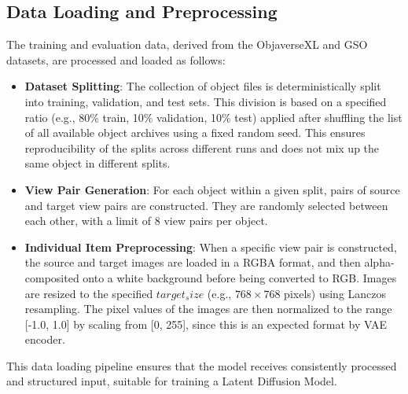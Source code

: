 \subsection{Data Loading and Preprocessing}\label{ssec:exp_data_loading}
The training and evaluation data, derived from the ObjaverseXL and GSO datasets, are processed and loaded as follows:

\begin{itemize}
  \item \textbf{Dataset Splitting}: The collection of object files is deterministically split into training, validation, and test sets. This division is based on a specified ratio (e.g., 80\% train, 10\% validation, 10\% test) applied after shuffling the list of all available object archives using a fixed random seed. This ensures reproducibility of the splits across different runs and does not mix up the same object in different splits.

  \item \textbf{View Pair Generation}: For each object within a given split, pairs of source and target view pairs are constructed. They are randomly selected between each other, with a limit of 8 view pairs per object.

  \item \textbf{Individual Item Preprocessing}: When a specific view pair is constructed, the source and target images are loaded in a RGBA format, and then alpha-composited onto a white background before being converted to RGB. Images are resized to the specified $target_size$ (e.g., $768 \times 768$ pixels) using Lanczos resampling. The pixel values of the images are then normalized to the range [-1.0, 1.0] by scaling from [0, 255], since this is an expected format by VAE encoder.
\end{itemize}

This data loading pipeline ensures that the model receives consistently processed and structured input, suitable for training a Latent Diffusion Model.

